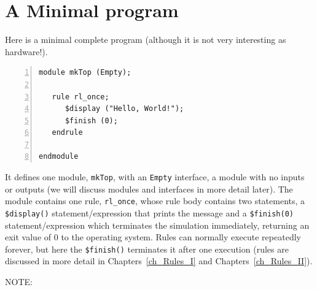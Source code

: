 \section{A Minimal {\BSV} program}

\label{Sec_Hello_World}

Here is a minimal complete {\BSV} program (although it is not very
interesting as hardware!).


{\footnotesize
\begin{Verbatim}[frame=single, numbers=left, label=in file Exercises/Ex-03-A-Hello-World/Top.bsv]
module mkTop (Empty);

   rule rl_once;
      $display ("Hello, World!");
      $finish (0);
   endrule
      
endmodule
\end{Verbatim}
}

It defines one module, \verb|mkTop|, with an \verb|Empty| interface,
{\ie} a module with no inputs or outputs (we will discuss modules and
interfaces in more detail later).  The module contains one rule,
\verb|rl_once|, whose rule body contains two statements, a
\verb|$display()| statement/expression that prints the message and a
\verb|$finish(0)| statement/expression which terminates the simulation
immediately, returning an exit value of 0 to the operating system.
Rules can normally execute repeatedly forever, but here the
\verb|$finish()| terminates it after one execution (rules are
discussed in more detail in Chapters~\ref{ch_Rules_I} and
Chapters~\ref{ch_Rules_II}).

\vspace{1ex}

NOTE: 

